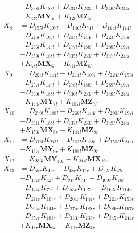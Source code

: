 \begin{multicols}{2}
\begin{align}
&- D_{358l}K_{188l} + D_{334l}K_{233l} + D_{346l}K_{244l}  \nonumber \\
&- K_{47l}\mathbf{MY}_{5l} + K_{42l}\mathbf{MZ}_{5l} \nonumber \\
X_{8} &= D_{155l}K_{107l} - D_{146l}K_{71l} + D_{164l}K_{114l}  \nonumber \\
&- D_{213l}K_{107l} + D_{203l}K_{144l} + D_{223l}K_{153l}  \nonumber \\
&- D_{266l}K_{144l} + D_{277l}K_{188l} + D_{288l}K_{197l}  \nonumber \\
&- D_{359l}K_{188l} + D_{335l}K_{233l} + D_{347l}K_{244l}  \nonumber \\
&+ K_{78l}\mathbf{MX}_{6l} - K_{71l}\mathbf{MZ}_{6l} \nonumber \\
X_{9} &= D_{204l}K_{144l} - D_{214l}K_{107l} + D_{224l}K_{153l}  \nonumber \\
&- D_{267l}K_{144l} + D_{278l}K_{188l} + D_{289l}K_{197l}  \nonumber \\
&- D_{360l}K_{188l} + D_{336l}K_{233l} + D_{348l}K_{244l}  \nonumber \\
&- K_{114l}\mathbf{MY}_{7l} + K_{107l}\mathbf{MZ}_{7l} \nonumber \\
X_{10} &= D_{279l}K_{188l} - D_{268l}K_{144l} + D_{290l}K_{197l}  \nonumber \\
&- D_{361l}K_{188l} + D_{337l}K_{233l} + D_{349l}K_{244l}  \nonumber \\
&+ K_{153l}\mathbf{MX}_{8r} - K_{144l}\mathbf{MZ}_{8r} \nonumber \\
X_{11} &= D_{338l}K_{233l} - D_{362l}K_{188l} + D_{350l}K_{244l}  \nonumber \\
&- K_{197l}\mathbf{MY}_{9r} + K_{188l}\mathbf{MZ}_{9r} \nonumber \\
X_{12} &= K_{233l}\mathbf{MY}_{10r} - K_{244l}\mathbf{MX}_{10r} \nonumber \\
X_{13} &= D_{55r}K_{42r} - D_{48r}K_{11r} + D_{62r}K_{47r}  \nonumber \\
&- D_{101r}K_{42r} + D_{93r}K_{71r} + D_{109r}K_{78r}  \nonumber \\
&- D_{144r}K_{71r} + D_{153r}K_{107r} + D_{162r}K_{114r}  \nonumber \\
&- D_{211r}K_{107r} + D_{201r}K_{144r} + D_{221r}K_{153r}  \nonumber \\
&- D_{264r}K_{144r} + D_{275r}K_{188r} + D_{286r}K_{197r}  \nonumber \\
&- D_{357r}K_{188r} + D_{333r}K_{233r} + D_{345r}K_{244r}  \nonumber \\
&+ K_{19r}\mathbf{MX}_{4r} - K_{11r}\mathbf{MZ}_{4r} \nonumber \\

\end{align}
\end{multicols}
